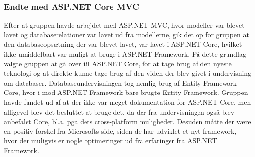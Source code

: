\subsubsection{Endte med ASP.NET Core MVC}
Efter at gruppen havde arbejdet med ASP.NET MVC, hvor modeller var blevet lavet og databaserelationer var lavet ud fra modellerne, gik det op for gruppen at den databaseopsætning der var blevet lavet, var lavet i ASP.NET Core, hvilket ikke umiddelbart var muligt at bruge i ASP.NET  Framework. På dette grundlag valgte gruppen at gå over til ASP.NET Core, for at tage brug af den nyeste teknologi og at direkte kunne tage brug af den viden der blev givet i undervisning om databaser. Databaseundervisningen tog nemlig brug af Entity Framework Core, hvor i mod ASP.NET Framework bare brugte Entity Framework.\newline 
\noindent Gruppen havde fundet ud af at der ikke var meget dokumentation for ASP.NET Core, men alligevel blev det besluttet at bruge det, da der fra undervisningen også blev anbefalet Core, bl.a. pga dets cross-platform muligheder. Desuden måtte der være en positiv forskel fra Microsofts side, siden de har udviklet et nyt framework, hvor der muligvis er nogle optimeringer ud fra erfaringer fra ASP.NET Framework.